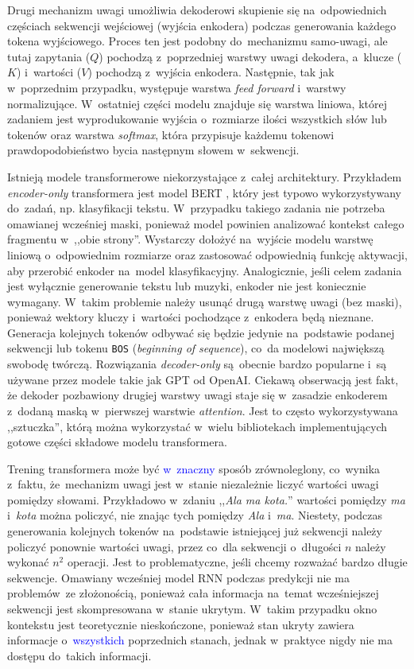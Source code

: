 \documentclass[data-science]{agh-wi} %
\begin{document}
Drugi mechanizm uwagi umożliwia dekoderowi skupienie się na~odpowiednich częściach sekwencji wejściowej (wyjścia enkodera) podczas generowania każdego tokena wyjściowego. Proces ten jest podobny do~mechanizmu samo-uwagi, ale tutaj zapytania ($Q$) pochodzą z~poprzedniej warstwy uwagi dekodera, a~klucze ($K$) i~wartości ($V$) pochodzą z~wyjścia enkodera. Następnie, tak jak w~poprzednim przypadku, występuje warstwa \textit{feed forward} i~warstwy normalizujące. W~ostatniej części modelu znajduje się warstwa liniowa, której zadaniem jest wyprodukowanie wyjścia o~rozmiarze ilości wszystkich słów lub tokenów oraz warstwa \textit{softmax}, która przypisuje każdemu tokenowi prawdopodobieństwo bycia następnym słowem w~sekwencji.

Istnieją modele transformerowe niekorzystające z~całej architektury. Przykładem \textit{encoder-only} transformera jest model BERT \cite{bert}, który jest typowo wykorzystywany do~zadań, np. klasyfikacji tekstu. W~przypadku takiego zadania nie potrzeba omawianej wcześniej maski, ponieważ model powinien analizować kontekst całego fragmentu w~,,obie strony''. Wystarczy dołożyć na~wyjście modelu warstwę liniową o~odpowiednim rozmiarze oraz zastosować odpowiednią funkcję aktywacji, aby przerobić enkoder na~model klasyfikacyjny.
Analogicznie, jeśli celem zadania jest wyłącznie generowanie tekstu lub muzyki, enkoder nie jest koniecznie wymagany. W~takim problemie należy usunąć drugą warstwę uwagi (bez maski), ponieważ wektory kluczy i~wartości pochodzące z~enkodera będą nieznane. Generacja kolejnych tokenów odbywać się będzie jedynie na~podstawie podanej sekwencji lub tokenu \texttt{BOS} (\textit{beginning of sequence}), co~da modelowi największą swobodę twórczą. Rozwiązania \textit{decoder-only} są~obecnie bardzo popularne i~są używane przez modele takie jak GPT od OpenAI. Ciekawą obserwacją jest fakt, że dekoder pozbawiony drugiej warstwy uwagi staje się w~zasadzie enkoderem z~dodaną maską w~pierwszej warstwie \textit{attention}. Jest to często wykorzystywana ,,sztuczka'', którą można wykorzystać w~wielu bibliotekach implementujących gotowe części składowe modelu transformera.

Trening transformera może być \textcolor{blue}{w~znaczny} sposób zrównoleglony, co~wynika z~faktu, że~mechanizm uwagi jest w~stanie niezależnie liczyć wartości uwagi pomiędzy słowami. Przykładowo w~zdaniu ,,\textit{Ala ma kota.}'' wartości pomiędzy \textit{ma} i~\textit{kota} można policzyć, nie znając tych pomiędzy \textit{Ala} i~\textit{ma}. Niestety, podczas generowania kolejnych tokenów na~podstawie istniejącej już sekwencji należy policzyć ponownie wartości uwagi, przez co~dla sekwencji o~długości $n$ należy wykonać $n^2$ operacji. Jest to problematyczne, jeśli chcemy rozważać bardzo długie sekwencje. Omawiany wcześniej model RNN podczas predykcji nie ma problemów~ze złożonością, ponieważ cała informacja na~temat wcześniejszej sekwencji jest skompresowana w~stanie ukrytym. W~takim przypadku okno kontekstu jest teoretycznie nieskończone, ponieważ stan ukryty zawiera informacje o~\textcolor{blue}{wszystkich} poprzednich stanach, jednak w~praktyce nigdy nie ma dostępu do~takich informacji.
\end{document}
